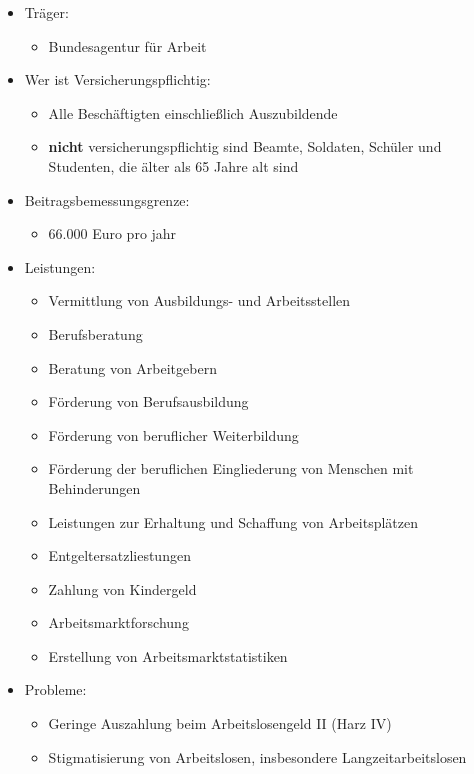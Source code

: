 \documentclass[a4paper, 12pt]{report}
\begin{document}
\begin{itemize}
    \item Träger:
	\begin{itemize}
	    \item Bundesagentur für Arbeit
	\end{itemize}
    \item Wer ist Versicherungspflichtig:
	\begin{itemize}
	    \item Alle Beschäftigten einschließlich Auszubildende
	    \item \textbf{nicht} versicherungspflichtig sind Beamte, Soldaten,
		Schüler und Studenten, die älter als 65 Jahre alt sind
	\end{itemize}
    \item Beitragsbemessungsgrenze:
	\begin{itemize}
	    \item 66.000 Euro pro jahr
	\end{itemize}
    \item Leistungen:
	\begin{itemize}
	    \item Vermittlung von Ausbildungs- und Arbeitsstellen
	    \item Berufsberatung
	    \item Beratung von Arbeitgebern
	    \item Förderung von Berufsausbildung
	    \item Förderung von beruflicher Weiterbildung
	    \item Förderung der beruflichen Eingliederung von Menschen mit
		Behinderungen
	    \item Leistungen zur Erhaltung und Schaffung von Arbeitsplätzen
	    \item Entgeltersatzliestungen
	    \item Zahlung von Kindergeld
	    \item Arbeitsmarktforschung
	    \item Erstellung von Arbeitsmarktstatistiken
	\end{itemize}
    \item Probleme:
	\begin{itemize}
	    \item Geringe Auszahlung beim Arbeitslosengeld II (Harz IV)
	    \item Stigmatisierung von Arbeitslosen, insbesondere
		Langzeitarbeitslosen
	\end{itemize}
\end{itemize}
\end{document}
